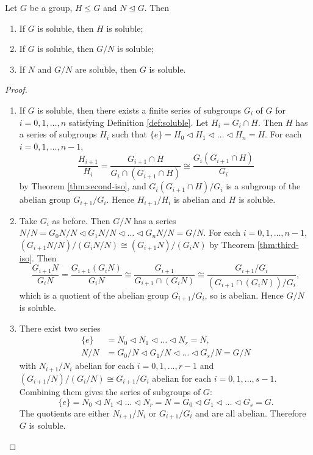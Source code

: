 \begin{theorem} \label{thm:soluble-main-appendix}
	Let $G$ be a group, $H \le G$ and $N \trianglelefteq G$. Then 
	\begin{enumerate}
		\item If $G$ is soluble, then $H$ is soluble;
		\item If $G$ is soluble, then $G / N$ is soluble; 
		\item If $N$ and $G / N$ are soluble, then $G$ is soluble. 
	\end{enumerate}
\end{theorem}
\begin{proof}
	\begin{enumerate}
		\item If $G$ is soluble, then there exists a finite series of subgroups $G_i$ of $G$ for $i = 0, 1, \dots, n$ satisfying Definition \ref{def:soluble}. Let $H_i = G_i \cap H$. Then $H$ has a series of subgroups $H_i$ such that $\{ e \} = H_0 \triangleleft H_1 \triangleleft \dots \triangleleft H_n = H.$
		For each $i = 0, 1, \dots, n - 1$, 
		$$
		\frac{H_{i+1}}{H_i} 
		= \frac{G_{i+1} \cap H}{G_i \cap (G_{i+1} \cap H)}
		\cong \frac{G_i(G_{i+1} \cap H)} {G_i}
		$$
		by Theorem \ref{thm:second-iso}, and ${G_i(G_{i+1} \cap H)}/{G_i}$ is a subgroup of the abelian group $G_{i+1} / G_{i}$. Hence $H_{i+1} / H_{i}$ is abelian and $H$ is soluble.
		\item Take $G_i$ as before. Then $G / N$ has a series
		$N/N = G_0 N / N \triangleleft G_1 N / N \triangleleft \dots \triangleleft G_n N / N  =  G / N. $
		For each $i = 0, 1, \dots, n - 1$, 
		$(G_{i+1} N / N) / (G_{i} N / N) \cong (G_{i+1} N) / (G_i N)$
		by Theorem \ref{thm:third-iso}. Then 
		$$
		\frac{G_{i+1} N}{G_i N} =\frac{G_{i+1}\left(G_i N\right)}{G_i N} \cong \frac{G_{i+1}}{G_{i+1} \cap\left(G_i N\right)} \cong \frac{G_{i+1} / G_i}{\left(G_{i+1} \cap\left(G_i N\right)\right) / G_i},
		$$
		which is a quotient of the abelian group $G_{i+1} / G_i$, so is abelian. Hence $G / N$ is soluble.
		\item There exist two series
		$$
		\begin{aligned}
			\{ e \} & =N_0 \triangleleft N_1 \triangleleft \ldots \triangleleft N_r=N, \\
			N / N & =G_0 / N \triangleleft G_1 / N \triangleleft \ldots \triangleleft G_s / N=G / N
		\end{aligned}
		$$
		with $N_{i+1} / N_{i}$ abelian for each $i = 0, 1, \dots, r-1$ and $(G_{i+1} / N)  / (G_{i} / N) \cong G_{i+1} / G_i $ abelian for each $i = 0,1, \dots, s-1$. Combining them gives the series of subgroups of $G$:
		$$
		\{ e \}=N_0 \triangleleft N_1 \triangleleft \ldots \triangleleft N_r=N=G_0 \triangleleft G_1 \triangleleft \ldots \triangleleft G_s=G .
		$$
		The quotients are either $N_{i+1} / N_i$  or $G_{i+1} / G_i$ and are all abelian. Therefore $G$ is soluble.
	\end{enumerate}
\end{proof}


